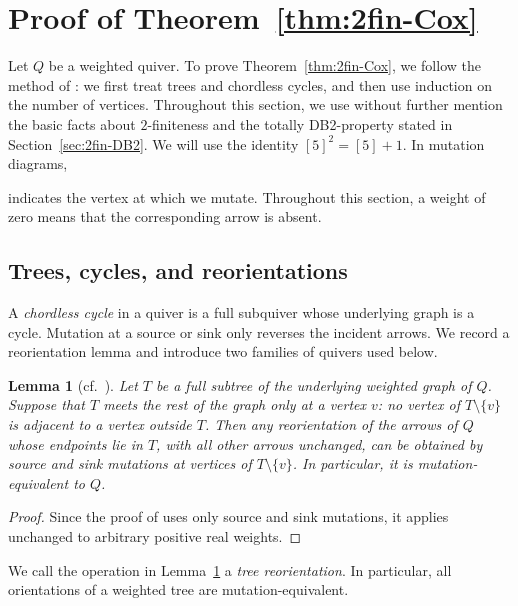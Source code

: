 \documentclass[11pt,reqno]{amsart}
\numberwithin{equation}{section}
\theoremstyle{definition}
\theoremstyle{plain}
\newtheorem{lemma}[example]{Lemma}
\newcommand{\bra}[1]{\left[#1\right]}
\begin{document}
\section{Proof of Theorem~\ref{thm:2fin-Cox}}\label{sec:pf-2fin-Cox}
	Let $Q$ be a weighted quiver. To prove Theorem~\ref{thm:2fin-Cox}, we follow the method of \cite[Section~9]{FZ03a}: we first treat trees and chordless cycles, and then use induction on the number of vertices. Throughout this section, we use without further mention the basic facts about $2$-finiteness and the totally DB2-property stated in Section~\ref{sec:2fin-DB2}. We will use the identity $\bra{5}^2=\bra{5}+1$. In mutation diagrams,
	indicates the vertex at which we mutate. Throughout this section, a weight of zero means that the corresponding arrow is absent.

\subsection{Trees, cycles, and reorientations}
	A \emph{chordless cycle} in a quiver is a full subquiver whose underlying graph is a cycle. Mutation at a source or sink only reverses the incident arrows. We record a reorientation lemma and introduce two families of quivers used below.
	
	\begin{lemma}[cf.~{\cite[Proposition~9.2]{FZ03a}}]\label{lem: chain reorientations}
		Let $T$ be a full subtree of the underlying weighted graph of $Q$. Suppose that $T$ meets the rest of the graph only at a vertex $v$: no vertex of $T\setminus\{v\}$ is adjacent to a vertex outside $T$. Then any reorientation of the arrows of $Q$ whose endpoints lie in $T$, with all other arrows unchanged, can be obtained by source and sink mutations at vertices of $T\setminus\{v\}$. In particular, it is mutation-equivalent to $Q$.
	\end{lemma}
	
	\begin{proof}
		Since the proof of \cite[Proposition~9.2]{FZ03a} uses only source and sink mutations, it applies unchanged to arbitrary positive real weights.
	\end{proof}
	
	We call the operation in Lemma~\ref{lem: chain reorientations} a \emph{tree reorientation}. In particular, all orientations of a weighted tree are mutation-equivalent.
	
\end{document}
